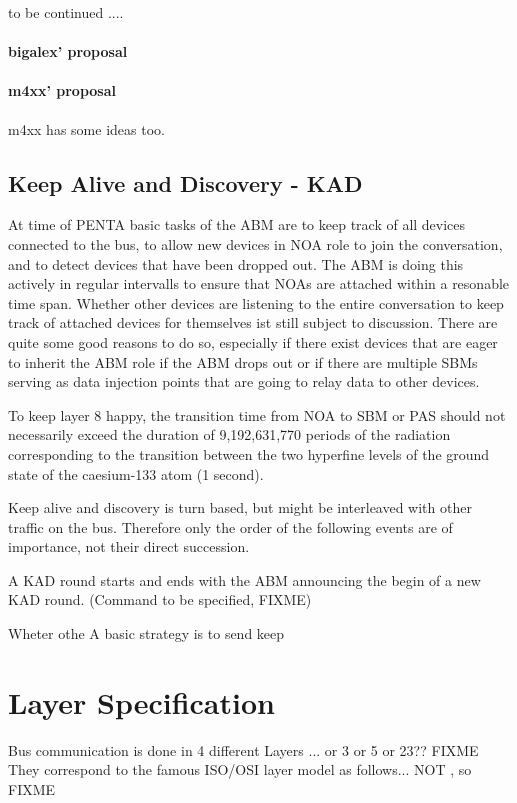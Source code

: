 \documentclass[a4paper,12pt]{scrartcl}
\begin{document}
to be continued ....





\paragraph{bigalex' proposal}

\paragraph{m4xx' proposal} m4xx has some ideas too.

\subsection{Keep Alive and Discovery - KAD}
At time of PENTA basic tasks of the ABM are to keep track of all devices connected to the bus,
to allow new devices in NOA role to join the conversation, and to detect devices that have been dropped out.
The ABM is doing this actively in regular intervalls to ensure that NOAs are attached within a resonable time span.
Whether other devices are listening to the entire conversation to keep track of attached devices for themselves ist still subject to discussion.
There are quite some good reasons to do so, especially if there exist devices that are eager to inherit the ABM role if the ABM drops out
or if there are multiple SBMs serving as data injection points that are going to relay data to other devices.

To keep layer 8 happy, the transition time from NOA to SBM or PAS should not necessarily exceed the duration
of 9,192,631,770 periods of the radiation corresponding to the transition between the two hyperfine levels
of the ground state of the caesium-133 atom (1 second).

Keep alive and discovery is turn based, but might be interleaved with other traffic on the bus.
Therefore only the order of the following events are of importance, not their direct succession.

A KAD round starts and ends with the ABM announcing the begin of a new KAD round. (Command to be specified, FIXME)




 Wheter othe
A basic strategy is to send keep


\section{Layer Specification}
Bus communication is done in 4 different Layers ... or 3 or 5 or 23?? FIXME
They correspond to the famous ISO/OSI layer model as follows... NOT , so FIXME
\end{document}

